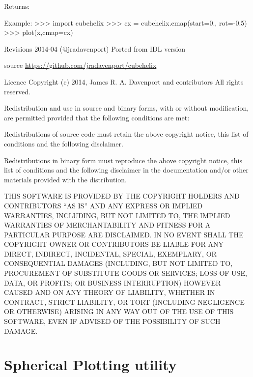\documentclass[a4paper,10pt,english]{sphinxmanual}
\begin{document}
\begin{fulllineitems}
\begin{description}
\item[{Returns:}] \leavevmode
{}

\end{description}

Example:
\textgreater{}\textgreater{}\textgreater{} import cubehelix
\textgreater{}\textgreater{}\textgreater{} cx = cubehelix.cmap(start=0., rot=-0.5)
\textgreater{}\textgreater{}\textgreater{} plot(x,cmap=cx)

Revisions
2014-04 (@jradavenport) Ported from IDL version

source
\href{https://github.com/jradavenport/cubehelix}{https://github.com/jradavenport/cubehelix}

Licence
Copyright (c) 2014, James R. A. Davenport and contributors All rights reserved.

Redistribution and use in source and binary forms, with or without modification, 
are permitted provided that the following conditions are met:

Redistributions of source code must retain the above copyright notice, this list of 
conditions and the following disclaimer.

Redistributions in binary form must reproduce the above copyright notice, this 
list of conditions and the following disclaimer in the documentation and/or 
other materials provided with the distribution.

THIS SOFTWARE IS PROVIDED BY THE COPYRIGHT HOLDERS AND CONTRIBUTORS ``AS IS'' 
AND ANY EXPRESS OR IMPLIED WARRANTIES, INCLUDING, BUT NOT LIMITED TO, THE 
IMPLIED WARRANTIES OF MERCHANTABILITY AND FITNESS FOR A PARTICULAR PURPOSE 
ARE DISCLAIMED. IN NO EVENT SHALL THE COPYRIGHT OWNER OR CONTRIBUTORS BE 
LIABLE FOR ANY DIRECT, INDIRECT, INCIDENTAL, SPECIAL, EXEMPLARY, OR CONSEQUENTIAL 
DAMAGES (INCLUDING, BUT NOT LIMITED TO, PROCUREMENT OF SUBSTITUTE GOODS OR SERVICES; 
LOSS OF USE, DATA, OR PROFITS; OR BUSINESS INTERRUPTION) HOWEVER CAUSED AND 
ON ANY THEORY OF LIABILITY, WHETHER IN CONTRACT, STRICT LIABILITY, OR TORT (INCLUDING 
NEGLIGENCE OR OTHERWISE) ARISING IN ANY WAY OUT OF THE USE OF THIS SOFTWARE, 
EVEN IF ADVISED OF THE POSSIBILITY OF SUCH DAMAGE.

\end{fulllineitems}



\chapter{Spherical Plotting utility}
\label{ryplotspherical:spherical-plotting-utility}\label{ryplotspherical::doc}
\end{document}

